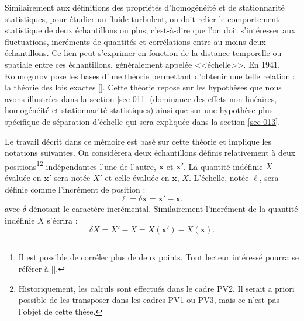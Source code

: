 Similairement aux définitions des propriétés d'homogénéité et de stationnarité statistiques, pour étudier un fluide turbulent, on doit relier le comportement statistique de deux échantillons ou plus, c'est-à-dire que l'on doit s'intéresser aux fluctuations, incréments de quantités et corrélations entre au moins deux échantillons. Ce lien peut s'exprimer en fonction de la distance temporelle ou spatiale entre ces échantillons, généralement appelée <<échelle>>. En 1941, Kolmogorov pose les bases d'une théorie permettant d'obtenir une telle relation : la théorie des lois exactes [\cite{frisch_turbulence_1995,kolmogorov_dissipation_1991,kolmogorov_local_1991}]. Cette théorie repose sur les hypothèses que nous avons illustrées dans la section \ref{sec-011} (dominance des effets non-linéaires, homogénéité et stationnarité statistiques) ainsi que sur une hypothèse plus spécifique de séparation d'échelle qui sera expliquée dans la section \ref{sec-013}.

Le travail décrit dans ce mémoire est basé sur cette théorie et implique les notations suivantes. On considèrera deux échantillons définis relativement à deux positions\footnote{Il est possible de corréler plus de deux points. Tout lecteur intéressé pourra se référer à [\cite{cho_simulations_2009}].}\footnote{Historiquement, les calculs sont effectués dans le cadre PV2. Il serait a priori possible de les transposer dans les cadres PV1 ou PV3, mais ce n'est pas l'objet de cette thèse.} indépendantes l'une de l'autre, $\mathbf{x}$ et $\mathbf{x'}$. La quantité indéfinie $X$ évaluée en $\mathbf{x'}$ sera notée $X'$ et celle évaluée en $\mathbf{x}$, $X$. L'échelle, notée $\boldsymbol{\ell}$, sera définie comme l'incrément de position : 
\begin{equation}
    \boldsymbol{\ell} = \delta \mathbf{x} = \mathbf{x'} - \mathbf{x} ,
\end{equation}
avec $\delta$ dénotant le caractère incrémental. Similairement l'incrément de la quantité indéfinie $X$ s'écrira : 
\begin{equation}
    \delta X = X' - X = X(\mathbf{x'}) - X(\mathbf{x})  .
\end{equation}

